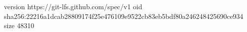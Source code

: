 version https://git-lfs.github.com/spec/v1
oid sha256:22216a1dcab28809174f25e476109e9522cb83eb5bdf80a246248425690ce934
size 48310
